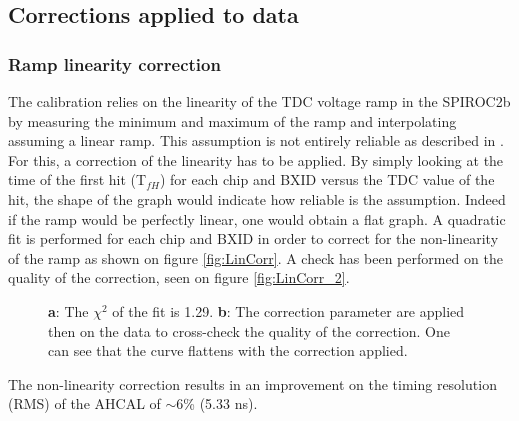 \documentclass[twoside,a4paper,11pt]{article}
\begin{document}
\subsection{Corrections applied to data}
\subsubsection{Ramp linearity correction}
\label{subsec:lin_corr}

The calibration relies on the linearity of the TDC voltage ramp in the SPIROC2b by measuring the minimum and maximum of the ramp and interpolating assuming a linear ramp. This assumption is not entirely reliable as described in \cite{OskarSSP, EldwanSSP}. For this, a correction of the linearity has to be applied. By simply looking at the time of the first hit (T$_{fH}$) for each chip and BXID versus the TDC value of the hit, the shape of the graph would indicate how reliable is the assumption. Indeed if the ramp would be perfectly linear, one would obtain a flat graph.
A quadratic fit is performed for each chip and BXID in order to correct for the non-linearity of the ramp as shown on figure \ref{fig:LinCorr}. A check has been performed on the quality of the correction, seen on figure \ref{fig:LinCorr_2}.
\begin{figure}[htbp]
	\hfill
	\caption[]{\textbf{a}: The $\chi^2$ of the fit is 1.29. \textbf{b}: The correction parameter are applied then on the data to cross-check the quality of the correction. One can see that the curve flattens with the correction applied.}
\end{figure}
The non-linearity correction results in an improvement on the timing resolution (RMS) of the AHCAL of $\sim$6\% (5.33 ns).
\end{document}
